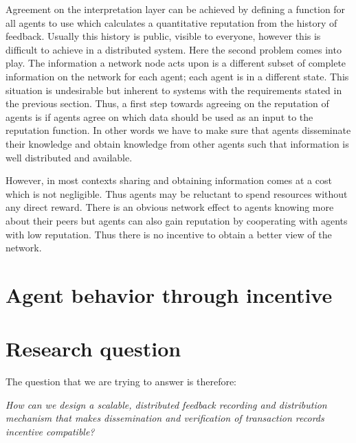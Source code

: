 Agreement on the interpretation layer can be achieved by defining a function for all agents to use
which calculates a quantitative reputation from the history of feedback. Usually this history is 
public, visible to everyone, however this is difficult to achieve in a distributed system. Here the
second problem comes into play. The information a network node acts upon 
is a different subset of complete information on the network for each agent; each agent is 
in a different state. This situation is undesirable but inherent to systems with the requirements 
stated in the previous section. Thus, a first step towards agreeing on the reputation of agents is 
if agents agree on which data should be used as an input to the reputation function. In 
other words we have to make sure that agents disseminate their knowledge and obtain knowledge from 
other agents such that information is well distributed and available.

However, in most contexts sharing and obtaining information comes at a cost which is not negligible.
Thus agents may be reluctant to spend resources without any direct reward. There is an obvious 
network effect to agents knowing more about their peers but agents can also gain reputation by 
cooperating with agents with low reputation. Thus there is no incentive to obtain a better view of
the network.

\section{Agent behavior through incentive}

\section{Research question}
The question that we are trying to answer is therefore:
\begin{center}
    \textit{How can we design a scalable, distributed feedback recording and distribution mechanism
    that makes dissemination and verification of transaction records incentive compatible?}
\end{center}

